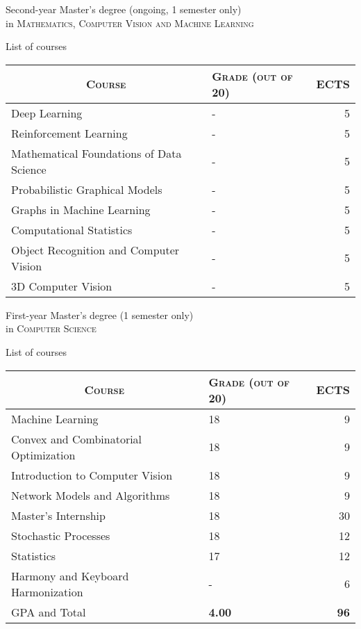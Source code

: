 \documentclass[a4paper,10pt]{article} %
\begin{document}
\newpage

\par{\centering\Large \hypertarget{notes}{Second-year Master's degree (ongoing, 1 semester
    only) \\in \textsc{Mathematics, Computer Vision and Machine Learning}}\par}\large{\centering List of
  courses\par}\normalsize

\begin{center}
\begin{tabular}{llr}
  \multicolumn{1}{c}{\textsc{Course}} & \textsc{Grade (out of 20)}&\textsc{ECTS}\\ \hline
  Deep Learning & - & 5 \\
  Reinforcement Learning & - & 5 \\
  Mathematical Foundations of Data Science & - & 5 \\
  Probabilistic Graphical Models & - & 5 \\
  Graphs in Machine Learning & - & 5 \\
  Computational Statistics & - & 5 \\
  Object Recognition and Computer Vision & - & 5 \\
  3D Computer Vision & - & 5 \\
\end{tabular}
\end{center}

\vspace{2cm}

\par{\centering\Large \hypertarget{notes}{First-year Master's degree (1 semester
    only) \\in \textsc{Computer Science}}\par}\large{\centering List of courses\par}\normalsize

\begin{center}
\begin{tabular}{llr}
  \multicolumn{1}{c}{\textsc{Course}} & \textsc{Grade (out of 20)}&\textsc{ECTS}\\ \hline
  Machine Learning & 18 & 9 \\
  Convex and Combinatorial Optimization & 18 & 9 \\
  Introduction to Computer Vision & 18 & 9 \\
  Network Models and Algorithms & 18 & 9 \\
  Master's Internship & 18 & 30 \\
  \hline
  Stochastic Processes & 18 & 12 \\
  Statistics & 17 & 12 \\
  \hline
  Harmony and Keyboard Harmonization & -\footnotemark[1] & 6 \\
  \hline
  \textsc{GPA} and Total & \textbf{4.00} & \textbf{96}
\end{tabular}
\end{center}
\end{document}
